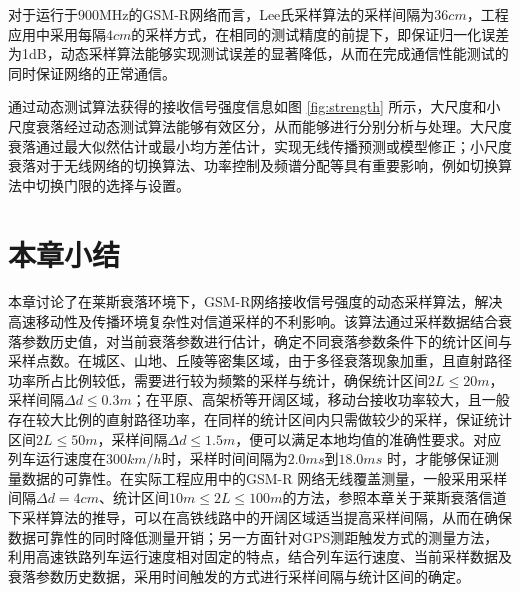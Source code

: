 \begin{figure}[!htp]
\centering
\hspace{1in}
\centering
\end{figure}

对于运行于900MHz的GSM-R网络而言，Lee氏采样算法的采样间隔为$36cm$，工程应用中采用每隔$4cm$的采样方式，在相同的测试精度的前提下，即保证归一化误差为1dB，动态采样算法能够实现测试误差的显著降低，从而在完成通信性能测试的同时保证网络的正常通信。

通过动态测试算法获得的接收信号强度信息如图 \ref{fig:strength} 所示，大尺度和小尺度衰落经过动态测试算法能够有效区分，从而能够进行分别分析与处理。大尺度衰落通过最大似然估计或最小均方差估计，实现无线传播预测或模型修正；小尺度衰落对于无线网络的切换算法、功率控制及频谱分配等具有重要影响，例如切换算法中切换门限的选择与设置。

\section{本章小结}
\label{sec:conclusion2}

本章讨论了在莱斯衰落环境下，GSM-R网络接收信号强度的动态采样算法，解决高速移动性及传播环境复杂性对信道采样的不利影响。该算法通过采样数据结合衰落参数历史值，对当前衰落参数进行估计，确定不同衰落参数条件下的统计区间与采样点数。在城区、山地、丘陵等密集区域，由于多径衰落现象加重，且直射路径功率所占比例较低，需要进行较为频繁的采样与统计，确保统计区间$2L \leq 20m$，采样间隔$\Delta d \leq 0.3m$；在平原、高架桥等开阔区域，移动台接收功率较大，且一般存在较大比例的直射路径功率，在同样的统计区间内只需做较少的采样，保证统计区间$2L \leq 50m$，采样间隔$\Delta d \leq 1.5m$，便可以满足本地均值的准确性要求。对应列车运行速度在$300km/h$时，采样时间间隔为$2.0ms$到$18.0ms$ 时，才能够保证测量数据的可靠性。在实际工程应用中的GSM-R 网络无线覆盖测量，一般采用采样间隔$\Delta d = 4cm$、统计区间$10m \leq 2L \leq 100m$的方法，参照本章关于莱斯衰落信道下采样算法的推导，可以在高铁线路中的开阔区域适当提高采样间隔，从而在确保数据可靠性的同时降低测量开销；另一方面针对GPS测距触发方式的测量方法，利用高速铁路列车运行速度相对固定的特点，结合列车运行速度、当前采样数据及衰落参数历史数据，采用时间触发的方式进行采样间隔与统计区间的确定。

\nocite{Akhoondzadeh2007modifi,andersen1995propagation,bjornson2010framework,gopal2009power,itoh2002performance}
\nocite{sijbers1998maximum,zhang1996analysis,zhu2005performance,mousa2010estimation}
\nocite{saleh1987statistical}
\nocite{goldsmith1994error}
\nocite{aja2008restoration}
\nocite{saleh1987statistical}
\nocite{sijbers1998maximum}\nocite{devore2000atr}\nocite{mousa2010estimation}
